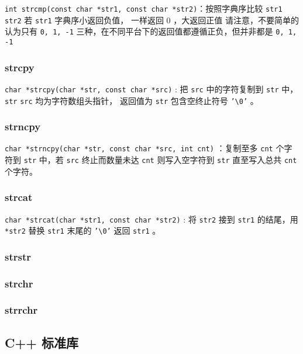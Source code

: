 \texttt{int strcmp(const char *str1, const char *str2)}：按照字典序比较 \texttt{str1 str2} 若 \texttt{str1} 字典序小返回负值， 一样返回 0 ，大返回正值 请注意，不要简单的认为只有 \texttt{0, 1, -1}  三种，在不同平台下的返回值都遵循正负，但并非都是 \texttt{0, 1, -1}

\subsubsection{strcpy}

\texttt{char *strcpy(char *str, const char *src)} : 把 \texttt{src} 中的字符复制到 \texttt{str} 中， \texttt{str} \texttt{src} 均为字符数组头指针， 返回值为 \texttt{str} 包含空终止符号 \texttt{'\textbackslash{}0'} 。

\subsubsection{strncpy}

\texttt{char *strncpy(char *str, const char *src, int cnt)} ：复制至多 \texttt{cnt} 个字符到 \texttt{str} 中，若 \texttt{src} 终止而数量未达 \texttt{cnt} 则写入空字符到 \texttt{str} 直至写入总共 \texttt{cnt} 个字符。

\subsubsection{strcat}

\texttt{char *strcat(char *str1, const char *str2)} : 将 \texttt{str2} 接到 \texttt{str1} 的结尾，用 \texttt{*str2} 替换 \texttt{str1} 末尾的 \texttt{'\textbackslash{}0'}  返回 \texttt{str1} 。

\subsubsection{strstr}

\subsubsection{strchr}

\subsubsection{strrchr}

\subsection{C++ 标准库}

